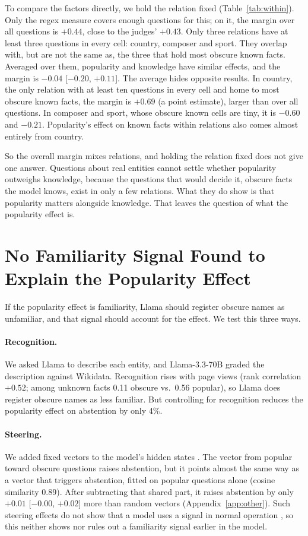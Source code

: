 \documentclass[letterpaper]{article} %
\begin{document}
To compare the factors directly, we hold the relation fixed (Table~\ref{tab:within}). Only the regex measure covers enough questions for this; on it, the margin over all questions is $+0.44$, close to the judges' $+0.43$. Only three relations have at least three questions in every cell: country, composer and sport. They overlap with, but are not the same as, the three that hold most obscure known facts. Averaged over them, popularity and knowledge have similar effects, and the margin is $-0.04$ [$-0.20$, $+0.11$]. The average hides opposite results. In country, the only relation with at least ten questions in every cell and home to most obscure known facts, the margin is $+0.69$ (a point estimate), larger than over all questions. In composer and sport, whose obscure known cells are tiny, it is $-0.60$ and $-0.21$. Popularity's effect on known facts within relations also comes almost entirely from country.

So the overall margin mixes relations, and holding the relation fixed does not give one answer. Questions about real entities cannot settle whether popularity outweighs knowledge, because the questions that would decide it, obscure facts the model knows, exist in only a few relations. What they do show is that popularity matters alongside knowledge. That leaves the question of what the popularity effect is.

\section{No Familiarity Signal Found to Explain the Popularity Effect}
\label{sec:familiarity}

If the popularity effect is familiarity, Llama should register obscure names as unfamiliar, and that signal should account for the effect. We test this three ways.

\paragraph{Recognition.}
We asked Llama to describe each entity, and Llama-3.3-70B graded the description against Wikidata. Recognition rises with page views (rank correlation $+0.52$; among unknown facts 0.11 obscure vs.\ 0.56 popular), so Llama does register obscure names as less familiar. But controlling for recognition reduces the popularity effect on abstention by only 4\%.

\paragraph{Steering.}
We added fixed vectors to the model's hidden states \citep{arditi2024refusal}. The vector from popular toward obscure questions raises abstention, but it points almost the same way as a vector that triggers abstention, fitted on popular questions alone (cosine similarity 0.89). After subtracting that shared part, it raises abstention by only $+0.01$ [$-0.00$, $+0.02$] more than random vectors (Appendix~\ref{app:other}). Such steering effects do not show that a model uses a signal in normal operation \citep{che2026feature}, so this neither shows nor rules out a familiarity signal earlier in the model.
\end{document}
